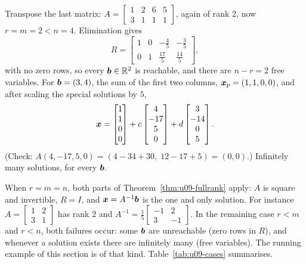 \begin{example}\label{ex:u09-wide}
Transpose the last matrix: $A=\begin{bmatrix}1&2&6&5\\3&1&1&1\end{bmatrix}$, again of rank $2$,
now $r=m=2<n=4$. Elimination gives
\[
R=\begin{bmatrix}1&0&-\tfrac45&-\tfrac35\\[2pt]0&1&\tfrac{17}{5}&\tfrac{14}{5}\end{bmatrix},
\]
with no zero rows, so every $\boldsymbol{b}\in\mathbb{R}^2$ is reachable, and there are $n-r=2$ free variables.
For $\boldsymbol{b}=(3,4)$, the sum of the first two columns, $\boldsymbol{x}_p=(1,1,0,0)$, and after scaling the
special solutions by $5$,
\[
\boldsymbol{x}=\begin{bmatrix}1\\1\\0\\0\end{bmatrix}+c\begin{bmatrix}4\\-17\\5\\0\end{bmatrix}
+d\begin{bmatrix}3\\-14\\0\\5\end{bmatrix}.
\]
(Check: $A(4,-17,5,0)=(4-34+30,\;12-17+5)=(0,0)$.) Infinitely many solutions, for every $\boldsymbol{b}$.
\end{example}

When $r=m=n$, both parts of Theorem~\ref{thm:u09-fullrank} apply: $A$ is square and invertible,
$R=I$, and $\boldsymbol{x}=A^{-1}\boldsymbol{b}$ is the one and only solution. For instance
$A=\begin{bmatrix}1&2\\3&1\end{bmatrix}$ has rank $2$ and
$A^{-1}=\tfrac15\begin{bmatrix}-1&2\\3&-1\end{bmatrix}$. In the remaining case $r<m$ and
$r<n$, both failures occur: some $\boldsymbol{b}$ are unreachable (zero rows in $R$), and whenever a
solution exists there are infinitely many (free variables). The running example
of this section is of that kind. Table~\ref{tab:u09-cases} summarises.

